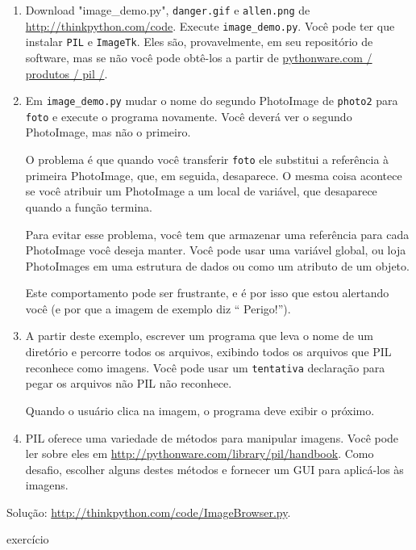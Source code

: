 \documentclass[10pt]{book}
\begin{document}
\begin{v erbatim}
\begin{}
\begin{enumerate}

\item Download \verbo "image_demo.py", \verb "danger.gif" e \verb "allen.png"
de \url{http://thinkpython.com/code}. Execute \verb "image_demo.py". Você
pode ter que instalar {\tt PIL} e {\tt ImageTk}.  
Eles são, provavelmente, em seu repositório de software, mas se não
você pode obtê-los a partir de \url{pythonware.com / produtos / pil /}.

\item Em \verb "image_demo.py" mudar o nome do segundo
PhotoImage de {\tt photo2} para {\tt foto} e execute o programa
novamente. Você deverá ver o segundo PhotoImage, mas não o primeiro.

O problema é que quando você transferir {\tt foto} ele substitui
a referência à primeira PhotoImage, que, em seguida, desaparece. O
mesma coisa acontece se você atribuir um PhotoImage a um local de
variável, que desaparece quando a função termina.

Para evitar esse problema, você tem que armazenar uma referência para cada
PhotoImage você deseja manter. Você pode usar uma variável global, ou
loja PhotoImages em uma estrutura de dados ou como um atributo de
um objeto.

Este comportamento pode ser frustrante, e é por isso que estou alertando
você (e por que a imagem de exemplo diz `` Perigo!'').

\item A partir deste exemplo, escrever um programa que leva
o nome de um diretório e percorre todos os arquivos, exibindo
todos os arquivos que PIL reconhece como imagens. Você pode usar um {\tt tentativa}
declaração para pegar os arquivos não PIL não reconhece.

Quando o usuário clica na imagem, o programa deve exibir o próximo.

\item PIL oferece uma variedade de métodos para manipular imagens.
Você pode ler sobre eles em \url{http://pythonware.com/library/pil/handbook}.
Como desafio, escolher alguns destes métodos e fornecer um
GUI para aplicá-los às imagens.

\end{enumerate}

Solução: \url{http://thinkpython.com/code/ImageBrowser.py}.

\end{} exercício



\end{v erbatim}
\end{document}
